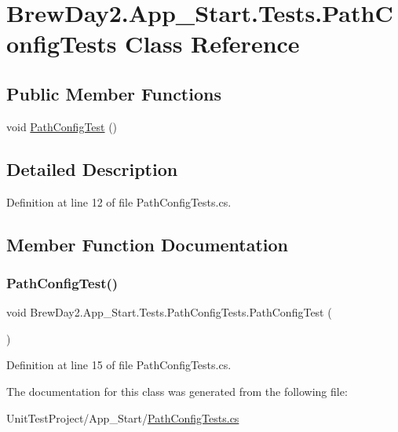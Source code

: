 \hypertarget{class_brew_day2_1_1_app___start_1_1_tests_1_1_path_config_tests}{}\section{Brew\+Day2.\+App\+\_\+\+Start.\+Tests.\+Path\+Config\+Tests Class Reference}
\label{class_brew_day2_1_1_app___start_1_1_tests_1_1_path_config_tests}
\subsection*{Public Member Functions}
\begin{DoxyCompactItemize}
\item 
void \mbox{\hyperlink{class_brew_day2_1_1_app___start_1_1_tests_1_1_path_config_tests_a3ab9caa034726cc1bf653fcf5d5fd44f}{Path\+Config\+Test}} ()
\end{DoxyCompactItemize}


\subsection{Detailed Description}


Definition at line 12 of file Path\+Config\+Tests.\+cs.



\subsection{Member Function Documentation}
\mbox{\label{class_brew_day2_1_1_app___start_1_1_tests_1_1_path_config_tests_a3ab9caa034726cc1bf653fcf5d5fd44f}} 
\subsubsection{\texorpdfstring{Path\+Config\+Test()}{PathConfigTest()}}
{\footnotesize\ttfamily void Brew\+Day2.\+App\+\_\+\+Start.\+Tests.\+Path\+Config\+Tests.\+Path\+Config\+Test (\begin{DoxyParamCaption}{ }\end{DoxyParamCaption})}



Definition at line 15 of file Path\+Config\+Tests.\+cs.



The documentation for this class was generated from the following file\+:\begin{DoxyCompactItemize}
\item 
Unit\+Test\+Project/\+App\+\_\+\+Start/\mbox{\hyperlink{_path_config_tests_8cs}{Path\+Config\+Tests.\+cs}}\end{DoxyCompactItemize}
